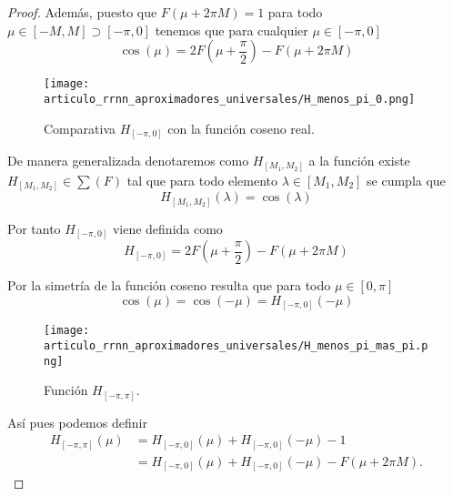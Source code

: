 \begin{proof}
    Además, puesto que $F(\mu + 2 \pi M) = 1$ para todo $\mu \in [-M, M] \supset [-\pi, 0]$ tenemos que
    para cualquier $\mu \in [-\pi, 0]$
    \begin{equation}
        \cos(\mu) = 2 F \left(\mu + \frac{\pi}{2} \right)  - F(\mu + 2 \pi M) 
    \end{equation}

    \begin{figure}[h]
        \centering
        \texttt{[image: articulo\_rrnn\_aproximadores\_universales/H\_menos\_pi\_0.png]}
        \caption{Comparativa $H_{[-\pi, 0]}$ con la función coseno real. }
        \label{fig:coseno_vs_H_menos_pi_cero}
    \end{figure}

    De manera generalizada denotaremos como $H_{[M_1,M_2 ]}$ a la función 
     existe $H_{[M_1,M_2 ]} \in \sum(F)$ 
    tal que para todo elemento $\lambda \in [M_1, M_2]$ se cumpla que 
    \begin{equation}
        H_{[M_1,M_2 ]}(\lambda) = \cos(\lambda)
    \end{equation}

    Por tanto $H_{[-\pi, 0]}$ viene definida como  
    \begin{equation}
        H_{[-\pi, 0]} = 2 F \left(\mu + \frac{\pi}{2} \right)  - F(\mu + 2 \pi M) 
    \end{equation}

    Por la simetría de la función coseno resulta que 
    para todo $\mu \in [0, \pi]$
    \begin{equation}
        \cos(\mu) = \cos(-\mu) = H_{[-\pi, 0]}(-\mu)
    \end{equation}
    \begin{figure}[h]
        \centering
        \texttt{[image: articulo\_rrnn\_aproximadores\_universales/H\_menos\_pi\_mas\_pi.png]}
        \caption{Función $H_{[-\pi, \pi]}$. }
        \label{fig:H_menos_pi_mas_pi}
    \end{figure}

    Así pues podemos definir 
    \begin{equation}
        \begin{split}
            H_{[-\pi, \pi ]}(\mu) &= H_{[-\pi, 0]}(\mu) + H_{[-\pi, 0]}(-\mu) - 1 \\
            &= H_{[-\pi, 0]}(\mu) + H_{[-\pi, 0]}(-\mu) - F(\mu + 2 \pi M). 
        \end{split} 
    \end{equation}  


\end{proof}
